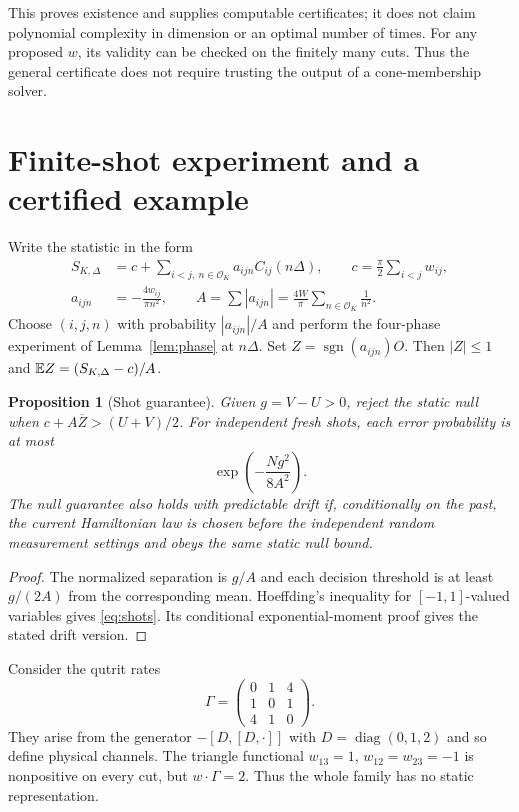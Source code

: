 \documentclass[11pt,a4paper]{article}
\newtheorem{proposition}[theorem]{Proposition}
\theoremstyle{remark}\newtheorem{remark}[theorem]{Remark}
\newcommand{\diag}{\operatorname{diag}}
\begin{document}
This proves existence and supplies computable certificates; it does not
claim polynomial complexity in dimension or an optimal number of times.
For any proposed $w$, its validity can be checked on the finitely many
cuts. Thus the general certificate does not require trusting the output
of a cone-membership solver.

\section{Finite-shot experiment and a certified example}\label{sec:shots}
Write the statistic in the form
\begin{equation}\label{eq:amplitude}
\begin{aligned}
 S_{K,\Delta}&=c+\sum_{i<j,\ n\in\mathcal O_K}a_{ijn}C_{ij}(n\Delta),
 \qquad c=\frac\pi2\sum_{i<j}w_{ij},\\
 a_{ijn}&=-\frac{4w_{ij}}{\pi n^2},\qquad
 A=\sum|a_{ijn}|=\frac{4W}{\pi}\sum_{n\in\mathcal O_K}\frac1{n^2}.
\end{aligned}
\end{equation}
Choose $(i,j,n)$ with probability $|a_{ijn}|/A$ and perform the
four-phase experiment of Lemma~\ref{lem:phase} at $n\Delta$.
Set $Z=\operatorname{sgn}(a_{ijn})O$. Then $|Z|\leq1$ and
$\mathbb E Z=(S_{K,\Delta}-c)/A$.

\begin{proposition}[Shot guarantee]\label{prop:shots}
Given $g=V-U>0$, reject the static null when
$c+A\overline Z>(U+V)/2$. For independent fresh shots, each error
probability is at most
\begin{equation}\label{eq:shots}
 \exp\!\left(-\frac{Ng^2}{8A^2}\right).
\end{equation}
The null guarantee also holds with predictable drift if, conditionally
on the past, the current Hamiltonian law is chosen before the independent
random measurement settings and obeys the same static null bound.
\end{proposition}
\begin{proof}
The normalized separation is $g/A$ and each decision threshold is at
least $g/(2A)$ from the corresponding mean. Hoeffding's inequality for
$[-1,1]$-valued variables gives \eqref{eq:shots}. Its conditional
exponential-moment proof gives the stated drift version.
\end{proof}

Consider the qutrit rates
\begin{equation}\label{eq:qutrit}
 \Gamma=\begin{pmatrix}0&1&4\\1&0&1\\4&1&0\end{pmatrix}.
\end{equation}
They arise from the generator $-[D,[D,\cdot]]$ with
$D=\diag(0,1,2)$ and so define physical channels. The triangle
functional $w_{13}=1$, $w_{12}=w_{23}=-1$ is nonpositive on every cut,
but $w\cdot\Gamma=2$. Thus the whole family has no static representation.
\end{document}
